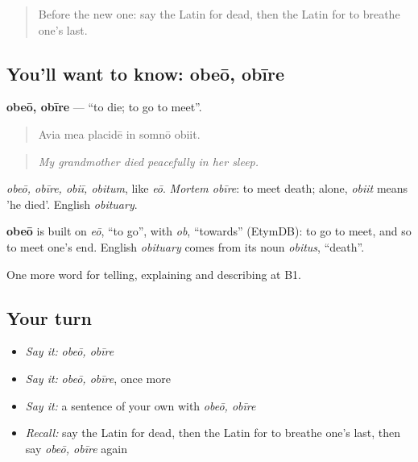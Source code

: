 \begin{quote}
Before the new one: say the Latin for dead, then the Latin for to breathe one's last.
\end{quote}

\subsection*{You'll want to know: obeō, obīre}
\textbf{obeō, obīre} — \textquotedblleft{}to die; to go to meet\textquotedblright{}.

\begin{quote}
Avia mea placidē in somnō obiit.
\end{quote}

\begin{quote}
\emph{My grandmother died peacefully in her sleep.}
\end{quote}

\emph{obeō, obīre, obiī, obitum}, like \emph{eō}. \emph{Mortem obīre}: to meet death; alone, \emph{obiit} means 'he died'. English \emph{obituary}.

\begin{cousinweb}
\textbf{obeō} is built on \emph{eō}, \textquotedblleft{}to go\textquotedblright{}, with \emph{ob}, \textquotedblleft{}towards\textquotedblright{} (EtymDB): to go to meet, and so to meet one's end. English \emph{obituary} comes from its noun \emph{obitus}, \textquotedblleft{}death\textquotedblright{}.
\end{cousinweb}

\begin{grammarlens}[title={What you've built}]
One more word for telling, explaining and describing at B1.
\end{grammarlens}

\subsection*{Your turn}
\begin{itemize}
\raggedright
  \item \emph{Say it:} \emph{obeō, obīre}
  \item \emph{Say it:} \emph{obeō, obīre}, once more
  \item \emph{Say it:} a sentence of your own with \emph{obeō, obīre}
  \item \emph{Recall:} say the Latin for dead, then the Latin for to breathe one's last, then say \emph{obeō, obīre} again
\end{itemize}

